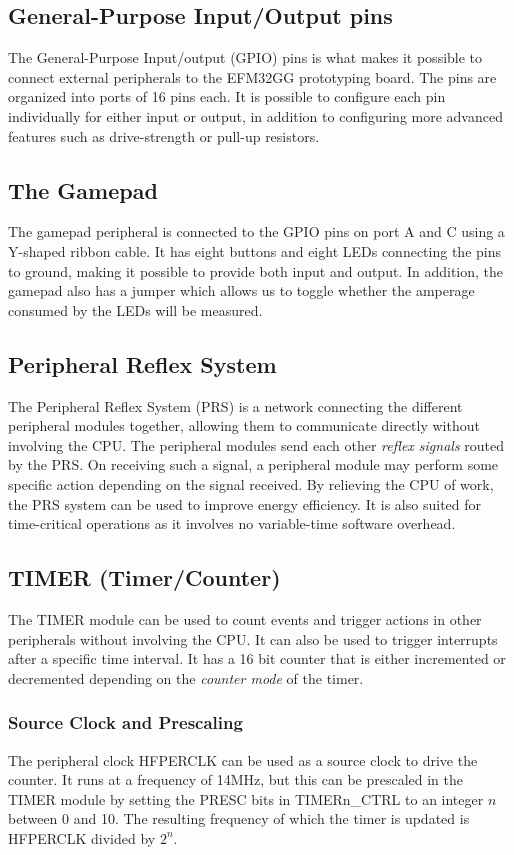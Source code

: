 \subsection{General-Purpose Input/Output pins}
The General-Purpose Input/output (GPIO) pins is what makes it possible to connect external peripherals to the EFM32GG prototyping board. The pins are organized into ports of 16 pins each. It is possible to configure each pin individually for either input or output, in addition to configuring more advanced features such as drive-strength or pull-up resistors.


\subsection{The Gamepad}
The gamepad peripheral is connected to the GPIO pins on port A and C using a Y-shaped ribbon cable. It has eight buttons and eight LEDs connecting the pins to ground, making it possible to provide both input and output. In addition, the gamepad also has a jumper which allows us to toggle whether the amperage consumed by the LEDs will be measured.


\subsection{Peripheral Reflex System}
The Peripheral Reflex System (PRS) is a network connecting the different peripheral modules together, allowing them to communicate directly without involving the CPU. The peripheral modules send each other \emph{reflex signals} routed by the PRS. On receiving such a signal, a peripheral module may perform some specific action depending on the signal received. By relieving the CPU of work, the PRS system can be used to improve energy efficiency. It is also suited for time-critical operations as it involves no variable-time software overhead.


\subsection{TIMER (Timer/Counter)}

The TIMER module can be used to count events and trigger actions in other peripherals without involving the CPU. It can also be used to trigger interrupts after a specific time interval. It has a 16 bit counter that is either incremented or decremented depending on the \emph{counter mode} of the timer.

\subsubsection{Source Clock and Prescaling} The peripheral clock HFPERCLK can be used as a source clock to drive the counter. It runs at a frequency of 14MHz, but this can be prescaled in the TIMER module by setting the PRESC bits in TIMERn\_CTRL to an integer $n$ between 0 and 10. The resulting frequency of which the timer is updated is HFPERCLK divided by $2^{n}$.

